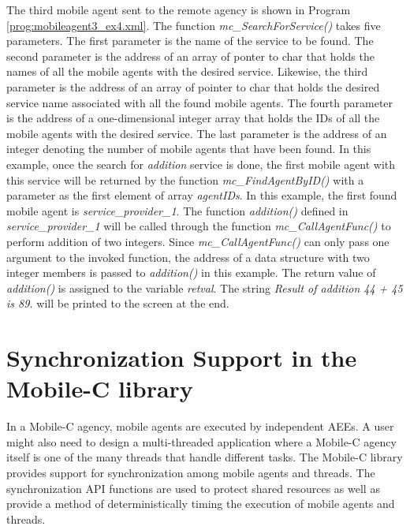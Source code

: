 \documentclass[11pt]{report}
\begin{document}
The third mobile agent sent to the remote agency is 
\textit{} shown in Program 
\vref{prog:mobileagent3_ex4.xml}.
The function \textit{mc\_SearchForService()} 
takes five parameters.
The first parameter is the name of the service to be found.
The second parameter is the address of an array of ponter to char that 
holds the names of all the mobile agents with the desired service.
Likewise, the third parameter is the address of an array of pointer to 
char that holds the desired service name associated with all the found 
mobile agents.
The fourth parameter is the address of a one-dimensional integer array that 
holds the IDs of all the mobile agents with the desired service.
The last parameter is the address of an integer denoting the number of mobile 
agents that have been found. 
In this example, once the search for \textit{addition} service is done, the 
first mobile agent with this service will be returned by the function 
\textit{mc\_FindAgentByID()} with a parameter as 
the first element of array \textit{agentIDs}.
In this example, the first found mobile agent is 
\textit{service\_provider\_1}.
The function \textit{addition()} defined in \textit{service\_provider\_1} 
will be called through the function \textit{mc\_CallAgentFunc()} to perform 
addition of two integers.
Since \textit{mc\_CallAgentFunc()} can only pass 
one argument to the invoked 
function, the address of a data structure with two integer members is passed 
to \textit{addition()} in this example.
The return value of \textit{addition()} is assigned to the variable 
\textit{retval}.
The string \textit{Result of addition 44 + 45 is 89.} will be printed to the 
screen at the end.   

\chapter{\label{chap:synchronization}Synchronization Support in the Mobile-C library}
In a Mobile-C agency, mobile agents are executed by independent AEEs. 
A user might also need to design a multi-threaded application where a Mobile-C 
agency itself is one of the many threads that handle different tasks.
The Mobile-C library provides support for synchronization among mobile 
agents and threads.
The synchronization API functions are used to protect shared resources as well 
as provide a method of deterministically timing the execution of mobile agents 
and threads.
\end{document}
